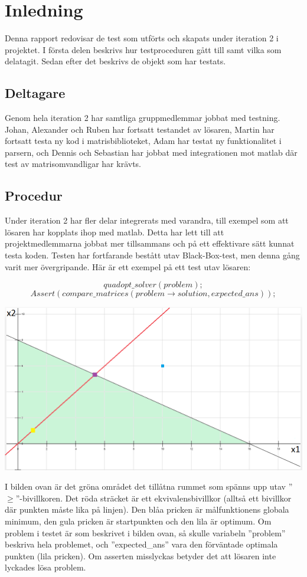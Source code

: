 \section{Inledning}
Denna rapport redovisar de test som utförts och skapats under iteration 2 i projektet. I första delen beskrivs hur testproceduren gått till samt vilka som delatagit. Sedan efter det beskrivs de objekt som har testats.
\subsection{Deltagare}
Genom hela iteration 2 har samtliga gruppmedlemmar jobbat med testning. Johan, Alexander och Ruben har fortsatt testandet av lösaren, Martin har fortsatt testa ny kod i matrisbiblioteket, Adam har testat ny funktionalitet i parsern, och Dennis och Sebastian har jobbat med integrationen mot matlab där test av matrisomvandligar har krävts. 

\subsection{Procedur}
Under iteration 2 har fler delar integrerats med varandra, till exempel som att lösaren har kopplats ihop med matlab. Detta har lett till att projektmedlemmarna jobbat mer tillsammans och på ett effektivare sätt kunnat testa koden. Testen har fortfarande bestått utav Black-Box-test, men denna gång varit mer övergripande. Här är ett exempel på ett test utav lösaren:

$$quadopt\_solver(problem);$$
$$Assert(compare\_matrices(problem\rightarrow solution, expected\_ans));$$

\includegraphics[scale=0.6]{prob.png}


\raggedright I bilden ovan är det gröna området det tillåtna rummet som spänns upp utav ''$\geq$''-bivillkoren. Det röda sträcket är ett ekvivalensbivillkor (alltså ett bivillkor där punkten måste lika på linjen). Den blåa pricken är målfunktionens globala minimum, den gula pricken är startpunkten och den lila är optimum. \newline
Om problem i testet är som beskrivet i bilden ovan, så skulle variabeln ''problem'' beskriva hela problemet, och ''expected\_ans'' vara den förväntade optimala punkten (lila pricken). Om asserten misslyckas betyder det att lösaren inte lyckades lösa problem.

